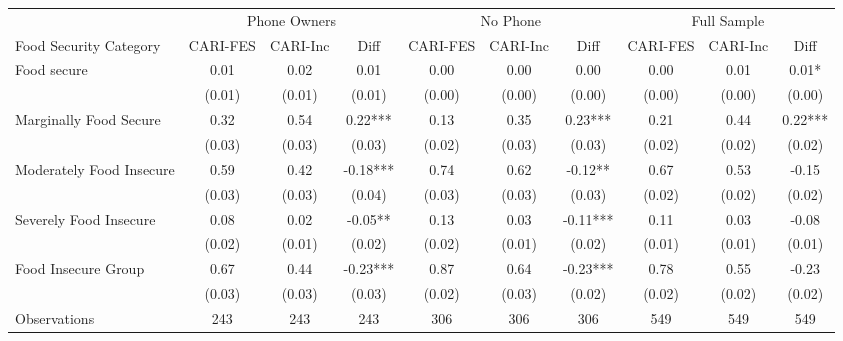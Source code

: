 \begin{tabular}{l*{9}c}
	\hline\hline
		\multicolumn{1}{c}{}     & \multicolumn{3}{c}{Phone Owners} & \multicolumn{3}{c}{No Phone} & \multicolumn{3}{c}{Full Sample}     \\
		Food Security Category   & CARI-FES  & CARI-Inc & Diff     & CARI-FES & CARI-Inc & Diff     & CARI-FES & CARI-Inc & Diff     \\ 	
		\hline
		Food secure              & 0.01      & 0.02      & 0.01     & 0.00     & 0.00     & 0.00     & 0.00      & 0.01      & 0.01*   \\
		& (0.01)    & (0.01)    & (0.01)   & (0.00)   & (0.00)   & (0.00)   & (0.00)    & (0.00)    & (0.00)  \\
		Marginally Food Secure   & 0.32      & 0.54      & 0.22***  & 0.13     & 0.35     & 0.23***  & 0.21      & 0.44      & 0.22*** \\
		& (0.03)    & (0.03)    & (0.03)   & (0.02)   & (0.03)   & (0.03)   & (0.02)    & (0.02)    & (0.02)  \\
		Moderately Food Insecure & 0.59      & 0.42      & -0.18*** & 0.74     & 0.62     & -0.12**  & 0.67      & 0.53      & -0.15   \\
		& (0.03)    & (0.03)    & (0.04)   & (0.03)   & (0.03)   & (0.03)   & (0.02)    & (0.02)    & (0.02)  \\
		Severely Food Insecure   & 0.08      & 0.02      & -0.05**  & 0.13     & 0.03     & -0.11*** & 0.11      & 0.03      & -0.08   \\
		& (0.02)    & (0.01)    & (0.02)   & (0.02)   & (0.01)   & (0.02)   & (0.01)    & (0.01)    & (0.01)  \\
		Food Insecure Group      & 0.67      & 0.44      & -0.23*** & 0.87     & 0.64     & -0.23*** & 0.78      & 0.55      & -0.23   \\
		& (0.03)    & (0.03)    & (0.03)   & (0.02)   & (0.03)   & (0.02)   & (0.02)    & (0.02)    & (0.02)  \\
		\hline
		Observations             & 243       & 243       & 243      & 306      & 306      & 306      & 549       & 549       & 549       \\
		\hline\hline
\end{tabular}
